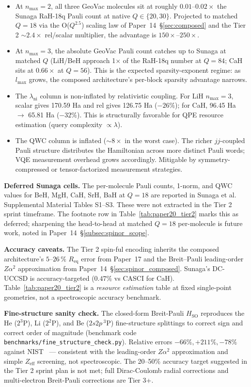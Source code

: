 \begin{itemize}
  \item At $n_{\max}=2$, all three GeoVac molecules sit at roughly
    $0.01$--$0.02\times$ the Sunaga RaH-18q Pauli count at native
    $Q \in \{20, 30\}$. Projected to matched $Q = 18$ via the
    O($Q^{2.5}$) scaling law of Paper~14~\S\ref{sec:composed} and the
    Tier 2 $\sim 2.4\times$ rel/scalar multiplier, the advantage is
    $150\times$--$250\times$.
  \item At $n_{\max}=3$, the absolute GeoVac Pauli count catches up to
    Sunaga at matched $Q$ (LiH/BeH approach 1$\times$ of the RaH-18q
    number at $Q = 84$; CaH sits at $0.66\times$ at $Q = 56$). This
    is the expected sparsity-exponent regime: as $l_{\max}$ grows,
    the composed architecture's per-block sparsity advantage narrows.
  \item The $\lambda_{\mathrm{ni}}$ column is non-inflated by
    relativistic coupling. For LiH $n_{\max}=3$, scalar gives
    170.59 Ha and rel gives 126.75 Ha ($-26\%$); for CaH,
    96.45 Ha $\to$ 65.81 Ha ($-32\%$). This is structurally favorable
    for QPE resource estimation (query complexity $\propto \lambda$).
  \item The QWC column is inflated ($\sim 8\times$ in the worst case).
    The richer $jj$-coupled Pauli structure distributes the
    Hamiltonian across more distinct Pauli words; VQE measurement
    overhead grows accordingly. Mitigable by symmetry-compressed
    or tensor-factorized measurement strategies.
\end{itemize}

\textbf{Deferred Sunaga cells.} The per-molecule Pauli counts, 1-norm,
and QWC values for BeH, MgH, CaH, SrH, BaH at $Q = 18$ are reported
in Sunaga et al.~\cite{Sunaga2025} Supplemental Material Tables
S1--S3. These were not extracted in the Tier 2 sprint timeframe. The
footnote row in Table~\ref{tab:paper20_tier2} marks this as deferred;
sharpening the head-to-head at matched $Q = 18$ per-molecule is
future work, noted in Paper~14~\S\ref{subsec:spinor_scope}.

\textbf{Accuracy caveats.} The Tier 2 spin-ful encoding inherits the
composed architecture's $5$--$26\,\%$ $R_{\mathrm{eq}}$ error from
Paper~17 and the Breit--Pauli leading-order $Z\alpha^2$ approximation
from Paper~14~\S\ref{sec:spinor_composed}. Sunaga's DC-UCCSD is
accuracy-targeted ($0.47\%$ vs CASCI for CaH). Table~\ref{tab:paper20_tier2}
is a \emph{resource estimation} table at fixed single-point
geometries, not a spectroscopic accuracy benchmark.

\textbf{Fine-structure sanity check.} The closed-form Breit-Pauli
$H_{\mathrm{SO}}$ reproduces the He ($2^3$P), Li ($2^2$P), and Be
($2s2p\,^3$P) fine-structure splittings to correct sign and correct
order of magnitude (benchmark code
\texttt{benchmarks/fine\_structure\_check.py}). Relative errors
$-66\%, +211\%, -78\%$ against NIST~\cite{NIST_ASD} --- consistent
with the leading-order $Z\alpha^2$ approximation and simple
$Z_{\mathrm{eff}}$ screening, not spectroscopic. The 20--50\%
accuracy target suggested in the Tier 2 sprint plan is not met; full
Dirac-Coulomb radial corrections and multi-electron Breit-Pauli
corrections are Tier 3+.
